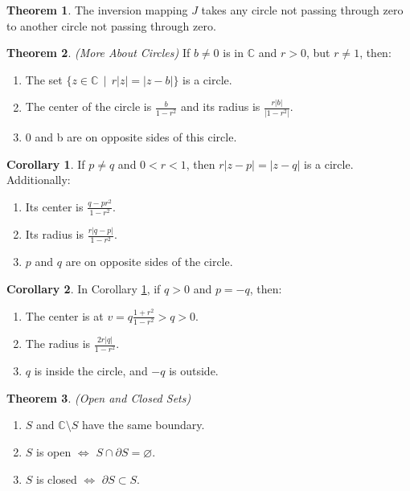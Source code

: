 \documentclass[a4paper]{article}
\theoremstyle{definition}
\newtheorem{theorem}{Theorem}
\newtheorem{corollary}{Corollary}
\begin{document}
	\begin{theorem}
		The inversion mapping $J$ takes any circle not passing through zero to another circle not passing through zero.
	\end{theorem}
	
	\begin{theorem}
		\emph{(More About Circles)}
		If $b \neq 0$ is in $\mathbb{C}$ and $r > 0$, but $r \neq 1$, then:
		\begin{enumerate}[label=\alph*.]
			\item The set $\{z \in \mathbb{C} \; \, | \; \,  r|z| = |z - b|\}$ is a circle.
			\item The center of the circle is $\frac{b}{1 - r^2}$ and its radius is $\frac{r|b|}{|1-r^2|}$.
			\item 0 and b are on opposite sides of this circle.
		\end{enumerate}
	\end{theorem}
	
	\begin{corollary}
		\label{circles}
		If $p \neq q$ and $0 < r < 1$, then $r|z - p| = |z - q|$ is a circle. Additionally:
		\begin{enumerate}[label=\alph*.]
			\item Its center is $\frac{q - pr^2}{1 - r^2}$.
			\item Its radius is $\frac{r|q - p|}{1 - r^2}$.
			\item $p$ and $q$ are on opposite sides of the circle.
		\end{enumerate}
	\end{corollary}
	
	\begin{corollary}
		In Corollary \ref{circles}, if $q > 0$ and $p = -q$, then:
		\begin{enumerate}[label=\alph*.]
			\item The center is at $v = q \frac{1+r^2}{1-r^2} > q > 0$.
			\item The radius is $\frac{2r|q|}{1-r^2}$.
			\item $q$ is inside the circle, and $-q$ is outside.
		\end{enumerate}
	\end{corollary}
	
	\begin{theorem}
		\emph{(Open and Closed Sets)}
		\begin{enumerate}[label=\alph*.]
			\item $S$ and $\mathbb{C} \setminus S$ have the same boundary.
			\item $S$ is open $\iff$ $S \cap \partial S = \varnothing$.
			\item $S$ is closed $\iff$ $\partial S \subset S$.
		\end{enumerate}
	\end{theorem}
	
\end{document}
